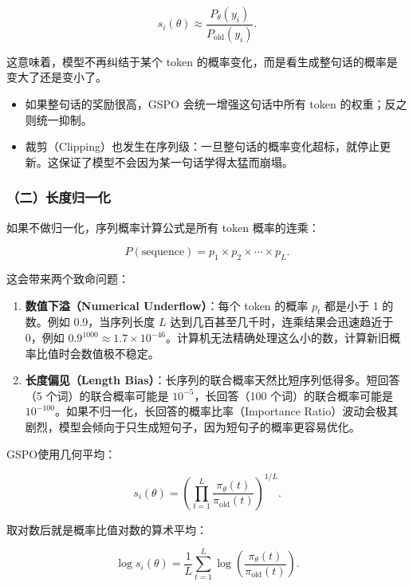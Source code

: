 \[
s_i(\theta)
\approx
\frac{P_\theta(y_i)}
{P_{\mathrm{old}}(y_i)}.
\]

这意味着，模型不再纠结于某个 token 的概率变化，而是看生成整句话的概率是变大了还是变小了。

\begin{itemize}
\tightlist
\item
  如果整句话的奖励很高，GSPO 会统一增强这句话中所有 token 的权重；反之则统一抑制。
\item
  裁剪（Clipping）也发生在序列级：一旦整句话的概率变化超标，就停止更新。这保证了模型不会因为某一句话学得太猛而崩塌。
\end{itemize}

\hypertarget{ux4e8cux957fux5ea6ux5f52ux4e00ux5316}{%
\subsubsection{（二）长度归一化}\label{ux4e8cux957fux5ea6ux5f52ux4e00ux5316}}

如果不做归一化，序列概率计算公式是所有 token 概率的连乘：

\[
P(\mathrm{sequence})
=
p_1\times p_2\times\cdots\times p_L.
\]

这会带来两个致命问题：

\begin{enumerate}
\def\labelenumi{\arabic{enumi}.}
\tightlist
\item
  \textbf{数值下溢（Numerical Underflow）}：每个 token 的概率 \(p_t\) 都是小于 1 的数。例如 0.9，当序列长度 \(L\) 达到几百甚至几千时，连乘结果会迅速趋近于 0，例如 \(0.9^{1000}\approx 1.7\times 10^{-46}\)。计算机无法精确处理这么小的数，计算新旧概率比值时会数值极不稳定。
\item
  \textbf{长度偏见（Length Bias）}：长序列的联合概率天然比短序列低得多。短回答（5 个词）的联合概率可能是 \(10^{-5}\)，长回答（100 个词）的联合概率可能是 \(10^{-100}\)。如果不归一化，长回答的概率比率（Importance Ratio）波动会极其剧烈，模型会倾向于只生成短句子，因为短句子的概率更容易优化。
\end{enumerate}

GSPO使用几何平均：

\[
s_i(\theta)
=
\left(
\prod_{t=1}^{L}
\frac{\pi_\theta(t)}
{\pi_{\mathrm{old}}(t)}
\right)^{1/L}.
\]

取对数后就是概率比值对数的算术平均：

\[
\log s_i(\theta)
=
\frac{1}{L}
\sum_{t=1}^{L}
\log\left(
\frac{\pi_\theta(t)}
{\pi_{\mathrm{old}}(t)}
\right).
\]

